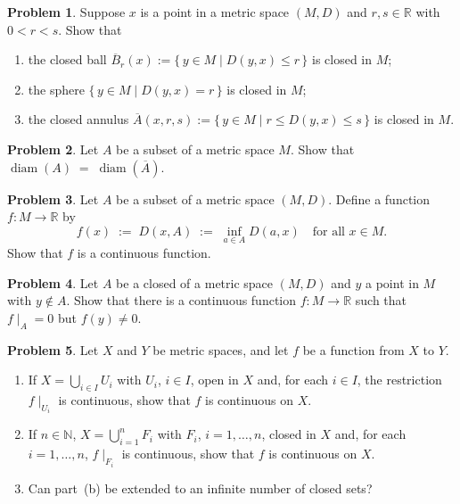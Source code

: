 \documentclass[10pt]{article}
\theoremstyle{definition} %
\newtheorem{problem}{Problem}
\theoremstyle{plain} %
\begin{document}
\begin{problem}
  Suppose $x$ is a point in a metric space $(M,D)$ and $r,s \in \mathbb{R}$ with $0 < r < s$.
  Show that
  \begin{enumerate}[label=(\alph*)]
      \item the closed ball  $\displaystyle \overline{B}_{r}(x) := \{\,y \in M \mid D(y,x) \le r\,\}$ is closed in $M$;
      \item the sphere $\displaystyle \{\,y \in M \mid D(y,x) = r\,\}$ is closed in $M$;
      \item the closed annulus $\displaystyle \overline{A}(x,r,s) := \{\,y \in M \mid r \le D(y,x) \le s\,\}$ is closed in $M$.
  \end{enumerate}
\end{problem}

\begin{problem}
  Let $A$ be a subset of a metric space $M$.  
  Show that $\operatorname{diam}(A) \;=\; \operatorname{diam}(\overline{A})$.
\end{problem}
\begin{problem}
  Let $A$ be a subset of a metric space $(M,D)$.  
  Define a function $f : M \to \mathbb{R}$ by
  \[
      f(x) \;:=\; D(x,A) \;:=\; \inf_{a \in A} D(a,x)
      \quad\text{for all } x \in M.
  \]
  Show that $f$ is a continuous function.
\end{problem}

\begin{problem}
  Let $A$ be a closed of a metric space $(M,D)$ and $y$ a point in $M$ with $y \notin A$.  
  Show that there is a continuous function $f : M \to \mathbb{R}$ such that $f\!\mid_{A}=0$ but $f(y)\ne 0$.
\end{problem}

\begin{problem}
  Let $X$ and $Y$ be metric spaces, and let $f$ be a function from $X$ to $Y$.
  \begin{enumerate}[label=(\alph*)]
      \item If $X = \bigcup_{i\in I} U_{i}$ with $U_{i}$, $i\in I$, open in $X$ and, for each $i\in I$, the restriction $f\!\mid_{U_{i}}$ is continuous, show that $f$ is continuous on $X$.
      \item If $n\in\mathbb{N}$, $X = \bigcup_{i=1}^{n} F_{i}$ with $F_{i}$, $i=1,\dots,n$, closed in $X$ and, for each $i=1,\dots,n$, $f\!\mid_{F_{i}}$ is continuous, show that $f$ is continuous on $X$.
      \item Can part (b) be extended to an infinite number of closed sets?
  \end{enumerate}
\end{problem}
\end{document}
